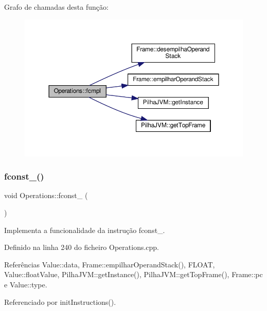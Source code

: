 Grafo de chamadas desta função\+:\nopagebreak
\begin{figure}[H]
\begin{center}
\leavevmode
\includegraphics[width=350pt]{classOperations_aa4a8e2be93a5cc69e40f483958014e39_cgraph}
\end{center}
\end{figure}
\mbox{\label{classOperations_ad3d2d82d63e7a96e144cdf014d6fb1d9}} 
\subsubsection{\texorpdfstring{fconst\+\_()}{fconst\_0()}}
{\footnotesize\ttfamily void Operations\+::fconst\+\_ (\begin{DoxyParamCaption}{ }\end{DoxyParamCaption})\hspace{0.3cm}{\ttfamily [private]}}



Implementa a funcionalidade da instrução fconst\+\_. 



Definido na linha 240 do ficheiro Operations.\+cpp.



Referências Value\+::data, Frame\+::empilhar\+Operand\+Stack(), F\+L\+O\+AT, Value\+::float\+Value, Pilha\+J\+V\+M\+::get\+Instance(), Pilha\+J\+V\+M\+::get\+Top\+Frame(), Frame\+::pc e Value\+::type.



Referenciado por init\+Instructions().

